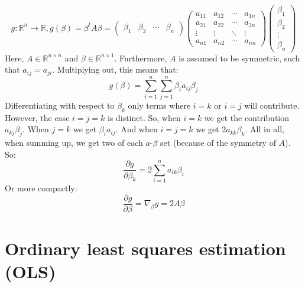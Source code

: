 \documentclass[12pt, a4paper]{article}
\begin{document}
\begin{equation}
g: \mathbb{R}^n\rightarrow\mathbb{R}, g(\beta)=\beta^t A\beta =
\begin{pmatrix}
\beta_1 & \beta_2 & \cdots & \beta_n
\end{pmatrix}
\begin{pmatrix}
a_{11} & a_{12} & \cdots & a_{1n} \\
a_{21} & a_{22} & \cdots & a_{2n} \\
\vdots & \vdots & \ddots & \vdots \\
a_{n1} & a_{n2} & \cdots & a_{nn}
\end{pmatrix}
\begin{pmatrix}
\beta_1 \\ \beta_2 \\ \vdots \\ \beta_n
\end{pmatrix}
\end{equation}
Here, $A\in\mathbb{R}^{n\times n}$ and $\beta\in\mathbb{R}^{n\times 1}$. Furthermore, $A$ is assumed to be symmetric, such that $a_{ij}=a_{ji}$. Multiplying out, this means that:
\begin{equation}
g(\beta)=\sum_{i=1}^n\sum_{j=1}^n\beta_i a_{ij}\beta_j
\end{equation}
Differentiating with respect to $\beta_k$ only terms where $i=k$ or $i=j$ will contribute. However, the case $i=j=k$ is distinct. So, when $i=k$ we get the contribution $a_{kj}\beta_j$. When $j=k$ we get $\beta_i a_{ij}$. And when $i=j=k$ we get $2a_{kk}\beta_k$. All in all, when summing up, we get two of each $a$-$\beta$ set (because of the symmetry of $A$). So:
\begin{equation}
\frac{\partial g}{\partial\beta_k}=2\sum_{i=1}^n a_{ik}\beta_i
\end{equation}
Or more compactly:
\begin{equation}
\label{quadformdif}
\frac{\partial g}{\partial \beta}=\nabla_\beta g=2A\beta
\end{equation}

\section{Ordinary least squares estimation (OLS)}
\end{document}
